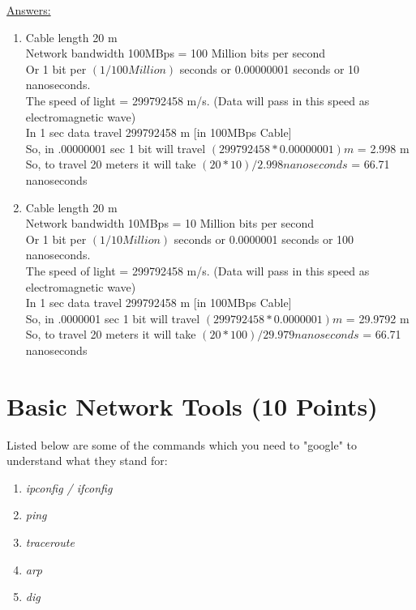 \documentclass{WeSTassignment}
\begin{document}
\underline{Answers:}
\begin{enumerate}
\item Cable length 20 m \\ 
Network bandwidth 100MBps = 100 Million bits per second \\ 
Or 1 bit per $(1 /100 Million)$ seconds or 0.00000001 seconds or 10 nanoseconds.\\ 
The speed of light = 299792458 m/s. (Data will pass in this speed as electromagnetic wave) \\
In 1 sec data travel 299792458 m [in 100MBps Cable] \\
So, in .00000001 sec 1 bit will travel $(299792458*0.00000001)m$ = 2.998 m \\
So,  to travel 20 meters it will take ${(20*10)/2.998} nanoseconds$ = 66.71 nanoseconds\\


\item Cable length 20 m \\ 
Network bandwidth 10MBps = 10 Million bits per second \\ 
Or 1 bit per $(1 /10 Million)$ seconds or 0.0000001 seconds or 100 nanoseconds.\\ 
The speed of light = 299792458 m/s. (Data will pass in this speed as electromagnetic wave) \\
In 1 sec data travel 299792458 m [in 100MBps Cable] \\
So, in .0000001 sec 1 bit will travel $(299792458*0.0000001)m$ = 29.9792 m \\
So,  to travel 20 meters it will take ${(20*100)/29.979} nanoseconds$ = 66.71 nanoseconds\\

\end{enumerate}



\section{Basic Network Tools (10 Points)}

Listed below are some of the commands which you need to "google" to understand what they stand for:
\begin{enumerate}
\item \emph{ipconfig / ifconfig}
\item \emph{ping}
\item \emph{traceroute}
\item \emph{arp}
\item \emph{dig}
\end{enumerate}
\end{document}
